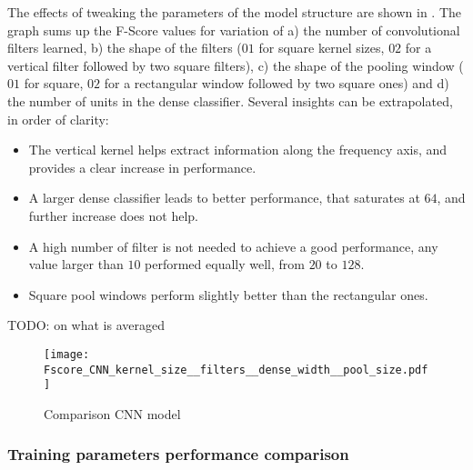 The effects of tweaking the parameters of the model structure are shown in
.
The graph sums up the F-Score values for variation of
a)
the number of convolutional filters learned,
b)
the shape of the filters ($01$ for square kernel sizes, $02$ for a vertical
filter followed by two square filters),
c)
the shape of the pooling window ($01$ for square, $02$ for a rectangular
window followed by two square ones)
and
d)
the number of units in the dense classifier.
Several insights can be extrapolated, in order of clarity:
\begin{itemize}
    \item The vertical kernel helps extract information along the frequency axis,
        and provides a clear increase in performance.
    \item A larger dense classifier leads to better performance,
        that saturates at $64$, and further increase does not help.
    \item A high number of filter is not needed to achieve a good performance,
        any value larger than $10$ performed equally well, from $20$ to $128$.
    \item Square pool windows perform slightly better than the rectangular ones.
\end{itemize}

TODO: on what is averaged

\begin{figure*}[h!]
    \centering
    \texttt{[image: Fscore\_CNN\_kernel\_size\_\_filters\_\_dense\_width\_\_pool\_size.pdf]}
    \caption{Comparison CNN model}%
    \label{fig:cnn_comparison_kernel_filter_dense_pool}
\end{figure*}

\subsubsection{Training parameters performance comparison}

